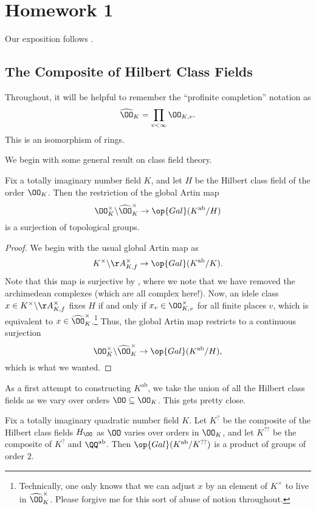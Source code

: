\documentclass[../notes.tex]{subfiles}
\begin{document}
\section{Homework 1}
Our exposition follows \cite[Section~3]{serre-cm}.

\subsection{The Composite of Hilbert Class Fields}
Throughout, it will be helpful to remember the ``profinite completion'' notation as
\[\widehat\OO_K=\prod_{v<\infty}\OO_{K,v}.\]
This is an isomorphism of rings.

We begin with some general result on class field theory.
\begin{lemma} \label{lem:artin-ideles-fixing-hilbert}
	Fix a totally imaginary number field $K$, and let $H$ be the Hilbert class field of the order $\OO_K$. Then the restriction of the global Artin map
	\[\OO_K^\times\backslash\widehat\OO_K^\times\to\op{Gal}(K^{\mathrm{ab}}/H)\]
	is a surjection of topological groups.
\end{lemma}
\begin{proof}
	We begin with the usual global Artin map as
	\[K^\times\backslash\AA_{K,f}^\times\to\op{Gal}(K^{\mathrm{ab}}/K).\]
	Note that this map is surjective by \cite[Corollary~8.2.2]{neukirch-cohom}, where we note that we have removed the archimedean complexes (which are all complex here!). Now, an idele class $x\in K^\times\backslash\AA_{K,f}^\times$ fixes $H$ if and only if $x_v\in\OO_{K,v}^\times$ for all finite places $v$, which is equivalent to $x\in\widehat\OO_K^\times$.\footnote{Technically, one only knows that we can adjust $x$ by an element of $K^\times$ to live in $\widehat\OO_K^\times$. Please forgive me for this sort of abuse of notion throughout.} Thus, the global Artin map restricts to a continuous surjection
	\[\OO_K^\times\backslash\widehat\OO_K^\times\to\op{Gal}(K^{\mathrm{ab}}/H),\]
	which is what we wanted.
\end{proof}
As a first attempt to constructing $K^{\mathrm{ab}}$, we take the union of all the Hilbert class fields as we vary over orders $\OO\subseteq\OO_K$. This gets pretty close.
\begin{proposition} \label{prop:union-hilbert-class-fields}
	Fix a totally imaginary quadratic number field $K$. Let $K^?$ be the composite of the Hilbert class fields $H_\OO$ as $\OO$ varies over orders in $\OO_K$, and let $K^{??}$ be the composite of $K^?$ and $\QQ^{\mathrm{ab}}$. Then $\op{Gal}(K^{\mathrm{ab}}/K^{??})$ is a product of groups of order $2$.
\end{proposition}
\end{document}
